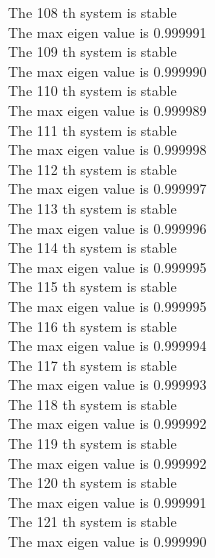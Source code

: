 \documentclass[11pt]{article}
\begin{document}
The 108 th system is stable \\
The max eigen value is 0.999991 \\
The 109 th system is stable \\
The max eigen value is 0.999990 \\
The 110 th system is stable \\
The max eigen value is 0.999989 \\
The 111 th system is stable \\
The max eigen value is 0.999998 \\
The 112 th system is stable \\
The max eigen value is 0.999997 \\
The 113 th system is stable \\
The max eigen value is 0.999996 \\
The 114 th system is stable \\
The max eigen value is 0.999995 \\
The 115 th system is stable \\
The max eigen value is 0.999995 \\
The 116 th system is stable \\
The max eigen value is 0.999994 \\
The 117 th system is stable \\
The max eigen value is 0.999993 \\
The 118 th system is stable \\
The max eigen value is 0.999992 \\
The 119 th system is stable \\
The max eigen value is 0.999992 \\
The 120 th system is stable \\
The max eigen value is 0.999991 \\
The 121 th system is stable \\
The max eigen value is 0.999990 \\

\newpage
\end{document}
